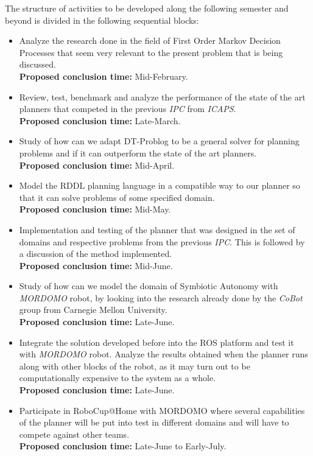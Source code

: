 The structure of activities to be developed along the following semester and
beyond is divided in the following sequential blocks:
\begin{itemize}
    \item Analyze the research done in the field of First Order Markov Decision
    Processes that seem very relevant to the present problem that is being
    discussed.\\
    \textbf{Proposed conclusion time: } Mid-February.
    \item Review, test, benchmark and analyze the performance of the state of
    the art planners that competed in the previous \textit{IPC} from
    \textit{ICAPS}. \\
    \textbf{Proposed conclusion time: } Late-March.
    \item Study of how can we adapt DT-Problog to be a general solver for
    planning problems and if it can outperform the state of the art planners.\\
    \textbf{Proposed conclusion time: } Mid-April.
    \item Model the RDDL planning language in a compatible way to our planner so
    that it can solve problems of some specified domain.\\
    \textbf{Proposed conclusion time: } Mid-May.
    \item Implementation and testing of the planner that was designed in
    the set of domains and respective problems from the previous \textit{IPC}.
    This is followed by a discussion of the method implemented.\\
    \textbf{Proposed conclusion time: } Mid-June.
    \item Study of how can we model the domain of Symbiotic Autonomy with
    \textit{MORDOMO} robot, by looking into the research already done by the
    \textit{CoBot} group from Carnegie Mellon University.\\
    \textbf{Proposed conclusion time: } Late-June.
    \item Integrate the solution developed before into the ROS platform and test
    it with \textit{MORDOMO} robot. Analyze the results obtained when the
    planner runs along with other blocks of the robot, as it may turn out to be
    computationally expensive to the system as a whole.\\
    \textbf{Proposed conclusion time: } Late-June.
    \item Participate in RoboCup@Home with MORDOMO where several capabilities of
    the planner will be put into test in different domains and will have to
    compete against other teams.\\
    \textbf{Proposed conclusion time: } Late-June to Early-July.
\end{itemize}

